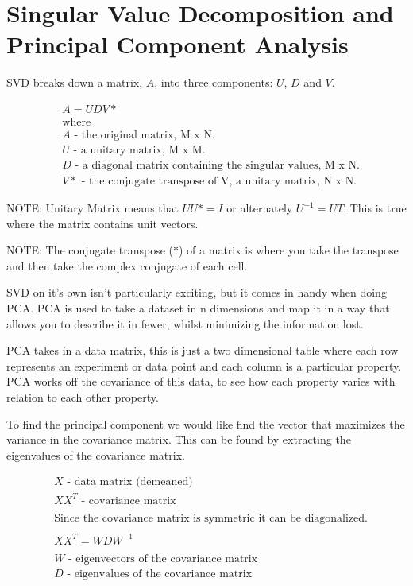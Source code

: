 \newpage
\section{Singular Value Decomposition and Principal Component Analysis}
SVD breaks down a matrix, $A$, into three components: $U$, $D$ and $V$.

\begin{align}
& A = UDV* \nonumber \\
& \text{where} \nonumber \\
& A \text{ - the original matrix, M x N.} \nonumber \\
& U \text{ - a unitary matrix, M x M.} \nonumber \\
& D \text{ - a diagonal matrix containing the singular values, M x N.} \nonumber \\
& V* \text{ - the conjugate transpose of V, a unitary matrix, N x N.} \nonumber
\end{align}

NOTE: Unitary Matrix means that $UU* = I$ or alternately $U^{-1} = UT$. This is true where the matrix contains unit vectors.

NOTE: The conjugate transpose ($*$) of a matrix is where you take the transpose and then take the complex conjugate of each cell.

SVD on it’s own isn’t particularly exciting, but it comes in handy when doing PCA. PCA is used to take a dataset in n dimensions and map it in a way that allows you to describe it in fewer, whilst minimizing the information lost.

PCA takes in a data matrix, this is just a two dimensional table where each row represents an experiment or data point and each column is a particular property. PCA works off the covariance of this data, to see how each property varies with relation to each other property.

To find the principal component we would like find the vector that maximizes the variance in the covariance matrix. This can be found by extracting the eigenvalues of the covariance matrix.

\begin{align*}
& X \text{ - data matrix (demeaned)} \\
& XX^{T} \text{ - covariance matrix} \\
& \\
& \text{Since the covariance matrix is symmetric it can be diagonalized.} \\
& \\
& XX^{T} = WDW^{-1} \\
& \\
& W \text{ - eigenvectors of the covariance matrix} \\
& D \text{ - eigenvalues of the covariance matrix} \\
\end{align*}

